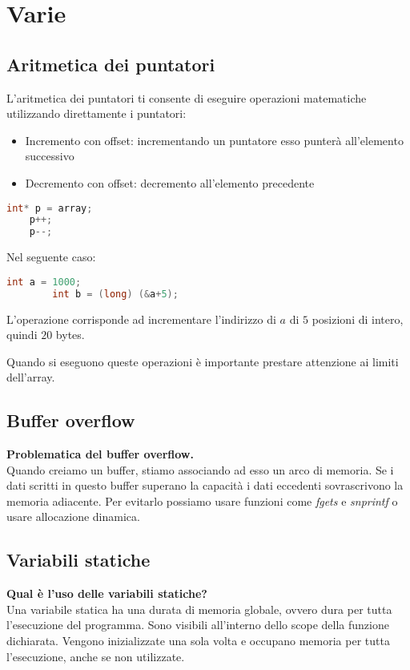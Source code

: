 \newpage
\section{Varie}
\subsection{Aritmetica dei puntatori}
L'aritmetica dei puntatori ti consente di eseguire operazioni matematiche utilizzando direttamente i puntatori:
\begin{itemize}
	\item Incremento con offset: incrementando un puntatore esso punterà all'elemento successivo
	\item Decremento con offset: decremento all'elemento precedente
\end{itemize}
\begin{lstlisting}[language=C]
	int* p = array;
	p++;
	p--;
\end{lstlisting}
\begin{example}
	Nel seguente caso:
	\begin{lstlisting}[language=C]
		int a = 1000;
		int b = (long) (&a+5);
	\end{lstlisting}
	L'operazione corrisponde ad incrementare l'indirizzo di $a$ di $5$ posizioni di intero, quindi $20$ bytes.
\end{example}
\begin{note}
	Quando si eseguono queste operazioni è importante prestare attenzione ai limiti dell'array.
\end{note}
\subsection{Buffer overflow}
\textbf{Problematica del buffer overflow.}\\
Quando creiamo un buffer, stiamo associando ad esso un arco di memoria. Se i dati scritti in questo buffer superano la capacità i dati eccedenti sovrascrivono la memoria adiacente. Per evitarlo possiamo usare funzioni come \textit{fgets} e \textit{snprintf} o usare allocazione dinamica.

\subsection{Variabili statiche}
\textbf{Qual è l'uso delle variabili statiche?}\\
Una variabile statica ha una durata di memoria globale, ovvero dura per tutta l'esecuzione del programma. Sono visibili all'interno dello scope della funzione dichiarata. Vengono inizializzate una sola volta e occupano memoria per tutta l'esecuzione, anche se non utilizzate.

